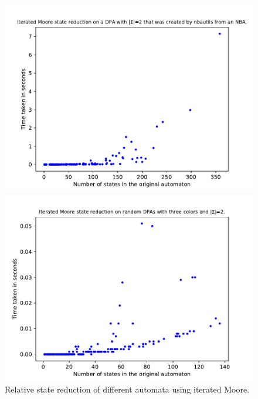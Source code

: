 \begin{figure}
\begin{minipage}{0.49\textwidth}
		\includegraphics[page=6,height=.3\textheight]{../data/analysis/iterated_moore/detnbaut_ap1.pdf} 
		\caption{Relative state reduction of different automata using iterated Moore.}
		\label{exp:fig:iterated_moore_size_hist}
	\end{minipage}
	\hfill
	\begin{minipage}{0.49\textwidth}
		\includegraphics[page=2,height=.3\textheight]{../data/analysis/iterated_moore/gendet_ap1.pdf} 

\end{minipage}
\end{figure}
